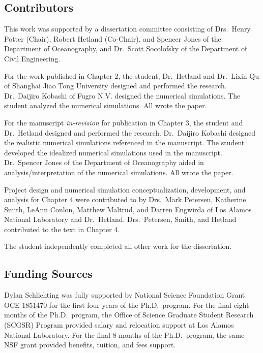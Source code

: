 

\begin{contributors}
\subsection*{Contributors}
This work was supported by a dissertation committee consisting of Drs.~Henry Potter (Chair), Robert Hetland (Co-Chair), and Spencer Jones of the Department of Oceanography, and Dr.~Scott Socolofsky of the Department of Civil Engineering.

For the work published in Chapter 2, the student, Dr.~Hetland and Dr.~Lixin Qu of Shanghai Jiao Tong University designed and performed the research. Dr.~Daijiro Kobashi of Fugro N.V. designed the numerical simulations. The student analyzed the numerical simulations. All wrote the paper. 

For the manuscript \textit{in-revision} for publication in Chapter 3, the student and Dr.~Hetland designed and performed the research. Dr.~Daijiro Kobashi designed the realistic numerical simulations referenced in the manuscript. The student developed the idealized numerical simulations used in the manuscript. Dr.~Spencer Jones of the Department of Oceanography aided in analysis/interpretation of the numerical simulations. All wrote the paper. 

Project design and numerical simulation conceptualization, development, and analysis for Chapter 4 were contributed to by Drs.~Mark Petersen, Katherine Smith, LeAnn Conlon, Matthew Maltrud, and Darren Engwirda of Los Alamos National Laboratory and Dr.~Hetland. Drs.~Petersen, Smith, and Hetland contributed to the text in Chapter 4. 

The student independently completed all other work for the dissertation.

\subsection*{Funding Sources}
Dylan Schlichting was fully supported by National Science Foundation Grant OCE-1851470 for the first four years of the Ph.D.~program. For the final eight months of the Ph.D.~program, the Office of Science Graduate Student Research (SCGSR) Program provided salary and relocation support at Los Alamos National Laboratory. For the final 8 months of the Ph.D.~program, the same NSF grant provided benefits, tuition, and fees support. 
\end{contributors}